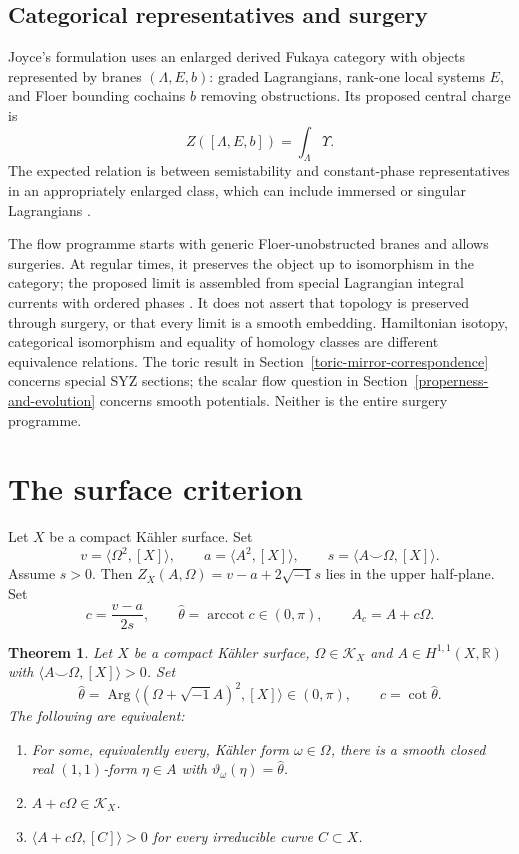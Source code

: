 \documentclass[12pt,reqno]{amsart}
\numberwithin{equation}{section}
\theoremstyle{plain}
\newcommand{\recallheading}{Theorem}
\newtheorem*{recalledtheorem}{\recallheading}
\newenvironment{theoremrecall}[1]{%
 \renewcommand{\recallheading}{Theorem~\ref{#1} (recalled)}%
 \begin{recalledtheorem}%
}{\end{recalledtheorem}}
\theoremstyle{definition}
\newcommand{\cK}{\mathcal K}
\newcommand{\R}{\mathbb R}
\newcommand{\SurfaceCriterionStatement}{%
Let $X$ be a compact K\"ahler surface, $\Omega\in\cK_X$ and
$A\in H^{1,1}(X,\R)$ with $\langle A\smile\Omega,[X]\rangle>0$.
Set
\[
 \widehat\theta=\operatorname{Arg}\langle(\Omega+\sqrt{-1}A)^2,[X]\rangle
 \in(0,\pi),\qquad c=\cot\widehat\theta.
\]
The following are equivalent:
\begin{enumerate}
\item For some, equivalently every, K\"ahler form $\omega\in\Omega$,
there is a smooth closed real $(1,1)$-form $\eta\in A$ with
$\vartheta_\omega(\eta)=\widehat\theta$.
\item $A+c\Omega\in\cK_X$.
\item $\langle A+c\Omega,[C]\rangle>0$ for every irreducible curve
$C\subset X$.
\end{enumerate}
}
\begin{document}
\subsection{Categorical representatives and surgery}
Joyce's formulation uses an enlarged derived Fukaya category with
objects represented by branes $(\Lambda,E,b)$: graded Lagrangians,
rank-one local systems $E$, and Floer bounding cochains $b$ removing
obstructions. Its proposed central charge is
\[
 Z([\Lambda,E,b])=\int_\Lambda\Upsilon.
\]
The expected relation is between semistability and constant-phase
representatives in an appropriately enlarged class, which can include
immersed or singular Lagrangians
\cite[Conjecture 3.2]{Joy15}.

The flow programme starts with generic Floer-unobstructed branes and
allows surgeries. At regular times, it preserves the object up to
isomorphism in the category; the proposed limit is assembled from
special Lagrangian integral currents with ordered phases
\cite[Conjecture 3.34]{Joy15}. It does not assert that topology is
preserved through surgery, or that every limit is a smooth embedding.
Hamiltonian isotopy, categorical isomorphism and equality of homology
classes are different equivalence relations. The toric result in
Section~\ref{toric-mirror-correspondence} concerns special SYZ sections;
the scalar flow question in Section~\ref{properness-and-evolution}
concerns smooth potentials. Neither is the entire surgery programme.

\section{The surface criterion}\label{surface-criterion}
Let $X$ be a compact K\"ahler surface. Set
\[
 v=\langle\Omega^2,[X]\rangle,\qquad
 a=\langle A^2,[X]\rangle,\qquad
 s=\langle A\smile\Omega,[X]\rangle.
\]
Assume $s>0$. Then $Z_X(A,\Omega)=v-a+2\sqrt{-1}s$ lies in the upper
half-plane. Set
\begin{equation}\label{shifted-surface-class}
 c=\frac{v-a}{2s},\qquad
 \widehat\theta=\operatorname{arccot}c\in(0,\pi),\qquad A_c=A+c\Omega.
\end{equation}

\begin{theoremrecall}{thm-surface-criterion}
\SurfaceCriterionStatement
\end{theoremrecall}
\end{document}
